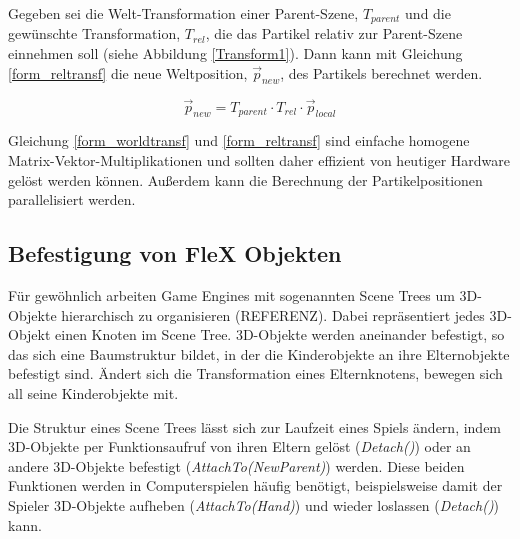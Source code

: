 
Gegeben sei die Welt-Transformation einer Parent-Szene, $T_{parent}$ und die gewünschte Transformation, $T_{rel}$, die das Partikel relativ zur Parent-Szene einnehmen soll (siehe Abbildung \ref{Transform1}). Dann kann mit Gleichung \ref{form_reltransf} die neue Weltposition, $\vec{p}_{new}$, des Partikels berechnet werden.

\begin{equation}
\vec{p}_{new} = T_{parent} \cdot T_{rel} \cdot \vec{p}_{local}
\label{form_reltransf}
\end{equation}

Gleichung \ref{form_worldtransf} und \ref{form_reltransf} sind einfache homogene Matrix-Vektor-Multiplikationen und sollten daher effizient von heutiger Hardware gelöst werden können. Außerdem kann die Berechnung der Partikelpositionen parallelisiert werden.

\subsection{Befestigung von FleX Objekten}
\label{subsec_attach}




Für gewöhnlich arbeiten Game Engines mit sogenannten Scene Trees um 3D-Objekte hierarchisch zu organisieren (REFERENZ). Dabei repräsentiert jedes 3D-Objekt einen Knoten im Scene Tree. 3D-Objekte werden aneinander befestigt, so das sich eine Baumstruktur bildet, in der die Kinderobjekte an ihre Elternobjekte befestigt sind. Ändert sich die Transformation eines Elternknotens, bewegen sich all seine Kinderobjekte mit. 


Die Struktur eines Scene Trees lässt sich zur Laufzeit eines Spiels ändern, indem 3D-Objekte per Funktionsaufruf von ihren Eltern gelöst (\textit{Detach()}) oder an andere 3D-Objekte befestigt (\textit{AttachTo(NewParent)}) werden. Diese beiden Funktionen werden in Computerspielen häufig benötigt, beispielsweise damit der Spieler 3D-Objekte aufheben (\textit{AttachTo(Hand)}) und wieder loslassen (\textit{Detach()}) kann.

